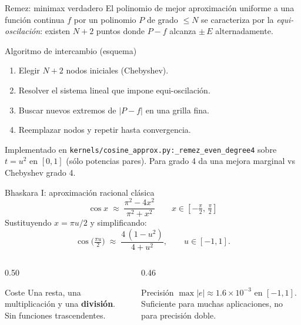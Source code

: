 \documentclass[aspectratio=169,10pt]{beamer}
\begin{document}
\begin{frame}{Remez: minimax verdadero}
  \footnotesize
  El polinomio de mejor aproximación uniforme a una función continua $f$
  por un polinomio $P$ de grado $\le N$ se caracteriza por la
  \emph{equi-oscilación}: existen $N+2$ puntos donde $P-f$ alcanza
  $\pm\,E$ alternadamente.

  \begin{block}{Algoritmo de intercambio (esquema)}
    \begin{enumerate}\setlength\itemsep{2pt}
      \item Elegir $N+2$ nodos iniciales (Chebyshev).
      \item Resolver el sistema lineal que impone equi-oscilación.
      \item Buscar nuevos extremos de $|P-f|$ en una grilla fina.
      \item Reemplazar nodos y repetir hasta convergencia.
    \end{enumerate}
  \end{block}

  \begin{tcolorbox}[colback=LCoral, colframe=Coral, fontupper=\footnotesize]
    Implementado en \texttt{kernels/cosine\_approx.py:\_remez\_even\_degree4}
    sobre $t = u^{2}$ en $[0,1]$ (sólo potencias pares).
    Para grado 4 da una mejora marginal vs Chebyshev grado 4.
  \end{tcolorbox}
\end{frame}

\begin{frame}{Bhaskara I: aproximación racional clásica}
  \footnotesize
  \[
    \cos x \;\approx\; \frac{\pi^{2} - 4x^{2}}{\pi^{2} + x^{2}}
    \qquad x \in [-\tfrac{\pi}{2},\,\tfrac{\pi}{2}]
  \]
  Sustituyendo $x = \pi u/2$ y simplificando:
  \[
    \cos\!\bigl(\tfrac{\pi u}{2}\bigr) \;\approx\;
       \frac{4\,(1 - u^{2})}{4 + u^{2}},
    \qquad u\in[-1,1].
  \]

  \begin{columns}[T]
    \begin{column}{0.50\textwidth}
      \begin{exampleblock}{Coste}
        Una resta, una multiplicación y una \textbf{división}. Sin
        funciones trascendentes.
      \end{exampleblock}
    \end{column}
    \begin{column}{0.46\textwidth}
      \begin{alertblock}{Precisión}
        $\max |e| \approx 1.6\!\times\!10^{-3}$ en $[-1,1]$. Suficiente
        para muchas aplicaciones, no para precisión doble.
      \end{alertblock}
    \end{column}
  \end{columns}
\end{frame}
\end{document}
